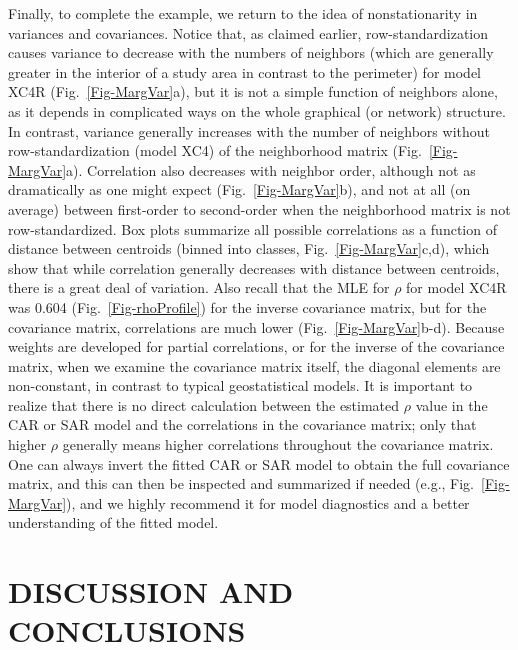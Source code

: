 \documentclass[11pt, titlepage]{article}\usepackage[]{graphicx}\usepackage[]{color}
\begin{document}
\begin{spacing}{1.9}
\begin{flushleft}
Finally, to complete the example, we return to the idea of nonstationarity in variances and covariances.  Notice that, as claimed earlier, row-standardization causes variance to decrease with the numbers of neighbors (which are generally greater in the interior of a study area in contrast to the perimeter) for model XC4R (Fig.~\ref{Fig-MargVar}a), but it is not a simple function of neighbors alone, as it depends in complicated ways on the whole graphical (or network) structure.  In contrast, variance generally increases with the number of neighbors without row-standardization (model XC4) of the neighborhood matrix (Fig.~\ref{Fig-MargVar}a). Correlation also decreases with neighbor order, although not as dramatically as one might expect (Fig.~\ref{Fig-MargVar}b), and not at all (on average) between first-order to second-order when the neighborhood matrix is not row-standardized. Box plots summarize all possible correlations as a function of distance between centroids (binned into classes, Fig.~\ref{Fig-MargVar}c,d), which show that while correlation generally decreases with distance between centroids, there is a great deal of variation. Also recall that the MLE for $\rho$ for model XC4R was 0.604 (Fig.~\ref{Fig-rhoProfile}) for the inverse covariance matrix, but for the covariance matrix, correlations are much lower (Fig.~\ref{Fig-MargVar}b-d). Because weights are developed for partial correlations, or for the inverse of the covariance matrix, when we examine the covariance matrix itself, the diagonal elements are non-constant, in contrast to typical geostatistical models. It is important to realize that there is no direct calculation between the estimated $\rho$ value in the CAR or SAR model and the correlations in the covariance matrix; only that higher $\rho$ generally means higher correlations throughout the covariance matrix. One can always invert the fitted CAR or SAR model to obtain the full covariance matrix, and this can then be inspected and summarized if needed (e.g., Fig.~\ref{Fig-MargVar}), and we highly recommend it for model diagnostics and a better understanding of the fitted model.

\section*{DISCUSSION AND CONCLUSIONS}


\end{flushleft}
\end{spacing}
\end{document}
